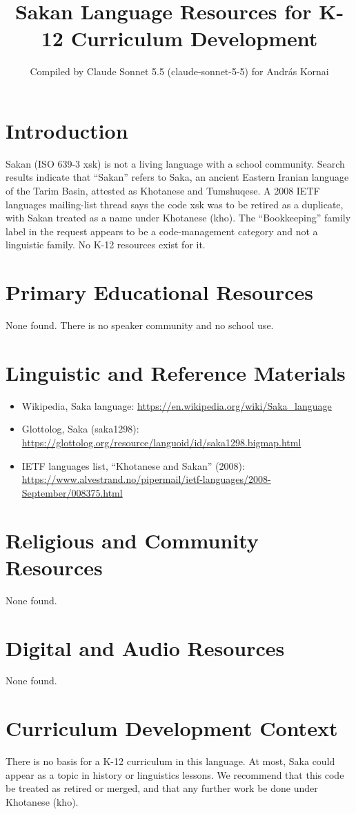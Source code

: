 \documentclass[12pt]{article}
\title{Sakan Language Resources for K-12 Curriculum Development}
\author{Compiled by Claude Sonnet 5.5 (claude-sonnet-5-5) for Andr\'as Kornai}
\date{}
\begin{document}
\maketitle

\section{Introduction}
Sakan (ISO 639-3 xsk) is not a living language with a school community. Search results indicate that ``Sakan'' refers to Saka, an ancient Eastern Iranian language of the Tarim Basin, attested as Khotanese and Tumshuqese. A 2008 IETF languages mailing-list thread says the code xsk was to be retired as a duplicate, with Sakan treated as a name under Khotanese (kho). The ``Bookkeeping'' family label in the request appears to be a code-management category and not a linguistic family. No K-12 resources exist for it.

\section{Primary Educational Resources}
None found. There is no speaker community and no school use.

\section{Linguistic and Reference Materials}
\begin{itemize}
\item Wikipedia, Saka language: \url{https://en.wikipedia.org/wiki/Saka_language}
\item Glottolog, Saka (saka1298): \url{https://glottolog.org/resource/languoid/id/saka1298.bigmap.html}
\item IETF languages list, ``Khotanese and Sakan'' (2008): \url{https://www.alvestrand.no/pipermail/ietf-languages/2008-September/008375.html}
\end{itemize}

\section{Religious and Community Resources}
None found.

\section{Digital and Audio Resources}
None found.

\section{Curriculum Development Context}
There is no basis for a K-12 curriculum in this language. At most, Saka could appear as a topic in history or linguistics lessons. We recommend that this code be treated as retired or merged, and that any further work be done under Khotanese (kho).
\end{document}
